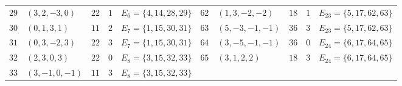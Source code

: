 \documentclass[
  aps,
  pra,
  reprint,
  superscriptaddress,
  amsmath,
  amssymb,
  nofootinbib,
  floatfix
]{revtex4-2}
\theoremstyle{definition}
\theoremstyle{remark}
\begin{document}
\begin{table}[t]
\begin{ruledtabular}
\begin{tabular}{rllll|rllll}
$29$ & $(3,2,-3,0)$    & $22$ & $1$ & $E_6=\{4,14,28,29\}$ &
$62$ & $(1,3,-2,-2)$   & $18$ & $1$ & $E_{23}=\{5,17,62,63\}$ \\
$30$ & $(0,1,3,1)$     & $11$ & $2$ & $E_7=\{1,15,30,31\}$ &
$63$ & $(5,-3,-1,-1)$  & $36$ & $3$ & $E_{23}=\{5,17,62,63\}$ \\
$31$ & $(0,3,-2,3)$    & $22$ & $3$ & $E_7=\{1,15,30,31\}$ &
$64$ & $(3,-5,-1,-1)$  & $36$ & $0$ & $E_{24}=\{6,17,64,65\}$ \\
$32$ & $(2,3,0,3)$     & $22$ & $0$ & $E_8=\{3,15,32,33\}$ &
$65$ & $(3,1,2,2)$     & $18$ & $3$ & $E_{24}=\{6,17,64,65\}$ \\
$33$ & $(3,-1,0,-1)$   & $11$ & $3$ & $E_8=\{3,15,32,33\}$ &
     &                 &      &     &
\end{tabular}
\end{ruledtabular}
\end{table}
\end{document}
